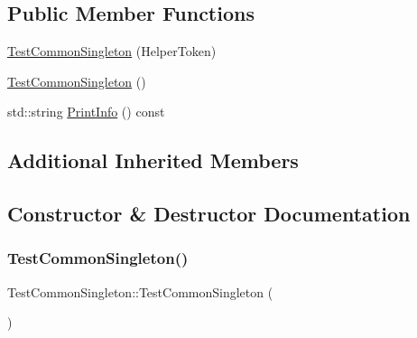 \subsection*{Public Member Functions}
\begin{DoxyCompactItemize}
\item 
\mbox{\hyperlink{class_test_common_singleton_a4ebb70c9574cbb589c9a51fcfa9e92e5}{Test\+Common\+Singleton}} (Helper\+Token)
\item 
\mbox{\hyperlink{class_test_common_singleton_ab54124ee482b7b31641fa1058e44b694}{Test\+Common\+Singleton}} ()
\item 
std\+::string \mbox{\hyperlink{class_test_common_singleton_a73ae91b8a0a23ae80e43c5effe13448c}{Print\+Info}} () const
\end{DoxyCompactItemize}
\subsection*{Additional Inherited Members}


\subsection{Constructor \& Destructor Documentation}
\mbox{\label{class_test_common_singleton_a4ebb70c9574cbb589c9a51fcfa9e92e5}} 
\subsubsection{\texorpdfstring{TestCommonSingleton()}{TestCommonSingleton()}\hspace{0.1cm}{\footnotesize\ttfamily [1/2]}}
{\footnotesize\ttfamily Test\+Common\+Singleton\+::\+Test\+Common\+Singleton (\begin{DoxyParamCaption}\item[{Helper\+Token}]{ }\end{DoxyParamCaption})\hspace{0.3cm}{\ttfamily [inline]}}

\mbox{\label{class_test_common_singleton_ab54124ee482b7b31641fa1058e44b694}} 
